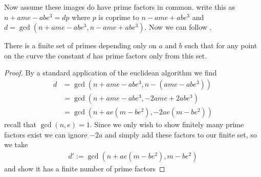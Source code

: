 Now assume these images do have prime factors in common.
write this as $n + ame - abe^3 = dp$ where $p$ is coprime to $n - ame + abe^3$
and $d = \gcd(n + ame - abe^3, n - ame + abe^3)$.
Now we can follow \cite[Section 4.1]{moniqueThesis}.
\begin{theorem} \label{thm:primeFactors}
  There is a finite set of primes depending only on $a$ and $b$
  such that for any point on the curve the constant $d$ has prime factors
  only from this set.
\end{theorem}
\begin{proof}
  By a standard application of the euclidean algorithm we find
  \begin{align*}
    d &= \gcd(n + ame - abe^3, n - (ame - abe^3)) \\
      &= \gcd(n + ame - abe^3, -2 ame + 2abe^3) \\
      &= \gcd(n + ae(m - be^2), -2ae(m - be^2))
  \end{align*}
  recall that $\gcd(n, e) = 1$. Since we only wish to
  show finitely many prime factors exist we can ignore $-2a$ and simply add
  these factors to our finite set, so we take
  \begin{align*}
    d' := \gcd(n + ae(m - be^2), m - be^2)
  \end{align*}
  and show it has a finite number of
  prime factors
\end{proof}
